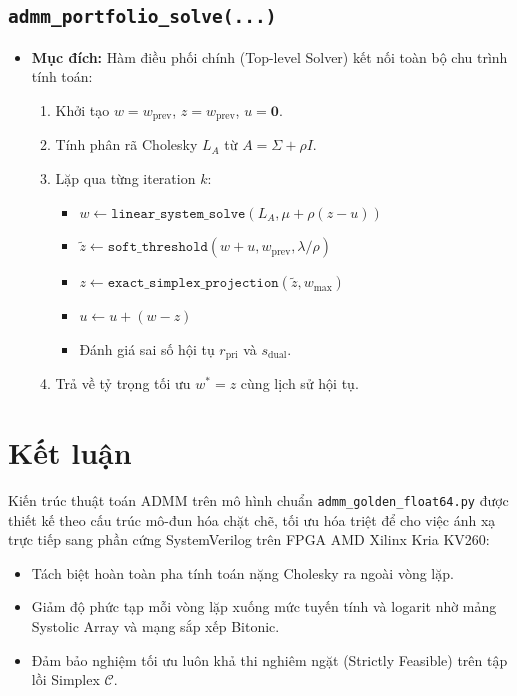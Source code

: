 \documentclass[12pt,a4paper]{article}
\begin{document}
\subsection{\texttt{admm\_portfolio\_solve(...)}}
\begin{itemize}[leftmargin=1.5em]
    \item \textbf{Mục đích:} Hàm điều phối chính (Top-level Solver) kết nối toàn bộ chu trình tính toán:
    \begin{enumerate}
        \item Khởi tạo $w = w_{\text{prev}}$, $z = w_{\text{prev}}$, $u = \mathbf{0}$.
        \item Tính phân rã Cholesky $L_A$ từ $A = \Sigma + \rho I$.
        \item Lặp qua từng iteration $k$:
        \begin{itemize}
            \item $w \leftarrow \texttt{linear\_system\_solve}(L_A, \mu + \rho(z - u))$
            \item $\tilde{z} \leftarrow \texttt{soft\_threshold}(w + u, w_{\text{prev}}, \lambda/\rho)$
            \item $z \leftarrow \texttt{exact\_simplex\_projection}(\tilde{z}, w_{\max})$
            \item $u \leftarrow u + (w - z)$
            \item Đánh giá sai số hội tụ $r_{\text{pri}}$ và $s_{\text{dual}}$.
        \end{itemize}
        \item Trả về tỷ trọng tối ưu $w^* = z$ cùng lịch sử hội tụ.
    \end{enumerate}
\end{itemize}

\section{Kết luận}

Kiến trúc thuật toán ADMM trên mô hình chuẩn \texttt{admm\_golden\_float64.py} được thiết kế theo cấu trúc mô-đun hóa chặt chẽ, tối ưu hóa triệt để cho việc ánh xạ trực tiếp sang phần cứng SystemVerilog trên FPGA AMD Xilinx Kria KV260:
\begin{itemize}[leftmargin=1.5em]
    \item Tách biệt hoàn toàn pha tính toán nặng Cholesky ra ngoài vòng lặp.
    \item Giảm độ phức tạp mỗi vòng lặp xuống mức tuyến tính và logarit nhờ mảng Systolic Array và mạng sắp xếp Bitonic.
    \item Đảm bảo nghiệm tối ưu luôn khả thi nghiêm ngặt (Strictly Feasible) trên tập lồi Simplex $\mathcal{C}$.
\end{itemize}
\end{document}
